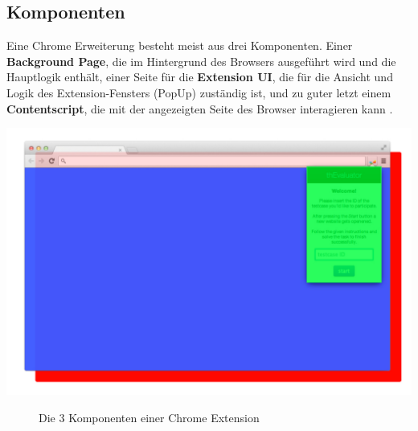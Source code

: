\subsection{Komponenten}

Eine Chrome Erweiterung besteht meist aus drei Komponenten. Einer \textbf{{\color{red}Background Page}}, die im Hintergrund des Browsers ausgeführt wird und die Hauptlogik enthält, einer Seite für die \textbf{{\color{green}Extension UI}}, die für die Ansicht und Logik des Extension-Fensters (PopUp) zuständig ist, und zu guter letzt einem \textbf{{\color{blue}Contentscript}}, die mit der angezeigten Seite des Browser interagieren kann \cite{extensionArchitecture}.

\begin{center}
\includegraphics[scale=0.34]{./images/layers}
\end{center}
\begin{figure}[htb]
    \centering
    \caption{Die 3 Komponenten einer Chrome Extension}
    \label{layers}
\end{figure}

